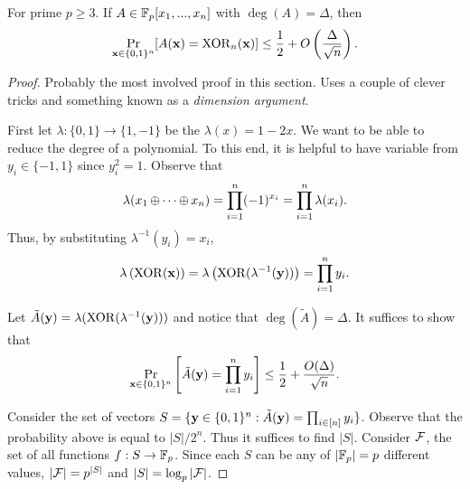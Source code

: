 \documentclass[11pt]{article}
\begin{document}
	\begin{theorem}
		\label{thm:UB-BoundPrRandPolyEqParity}
		For prime $p \geq 3$. If $A \in \mathbb{F}_p[x_1, ..., x_n]$ with $\deg(A) = \Delta$, then 
		\[\Pr_{\mathbf{x} \in \{0,1\}^n}[A(\mathbf{x}) = \mathrm{XOR}_n(\mathbf{x})] \leq \frac{1}{2} + O\left(\frac{\Delta}{\sqrt{n}}\right).\]
	\end{theorem}
	\begin{proof}
		Probably the most involved proof in this section. Uses a couple of clever tricks and something known as a \emph{dimension argument}.
		
		First let $\lambda: \{0,1\} \rightarrow \{1,-1\}$ be the $\lambda(x) = 1 - 2x$. We want to be able to reduce the degree of a polynomial. To this end, it is helpful to have variable from $y_i \in \{-1,1\}$ since $y_i^2 = 1$. Observe that 
		\[\lambda(x_1 \operatorname{\oplus} \cdots \operatorname{\oplus} x_n) = \prod_{i = 1}^{n} (-1)^{x_i} = \prod_{i = 1}^{n}\lambda(x_i).\]
		Thus, by substituting $\lambda^{-1}(y_i) = x_i$, 
		\[\lambda\left(\mathrm{XOR}(\mathbf{x})\right) = \lambda\left(\mathrm{XOR}(\lambda^{-1}(\mathbf{y}))\right)= \prod_{i = 1}^{n}y_i.\]
		
		Let $\tilde{A}(\mathbf{y}) = \lambda(\mathrm{XOR}(\lambda^{-1}(\mathbf{y})))$ and notice that $\deg(\tilde{A}) = \Delta$. It suffices to show that 
		\[\Pr_{\mathbf{x} \in \{0,1\}^n}\left[\tilde{A}(\mathbf{y}) = \prod_{i = 1}^{n}y_i\right] \leq \frac{1}{2} + \frac{O(\Delta)}{\sqrt{n}}.\]
		
		Consider the set of vectors $S = \{\mathbf{y} \in \{0,1\}^n: \tilde{A}(\mathbf{y}) = \prod_{i \in [n]} y_i\}$. Observe that the probability above is equal to $|S|/2^n$. Thus it suffices to find $|S|$. Consider $\mathcal{F}$, the set of all functions $f: S \rightarrow \mathbb{F}_p$. Since each $S$ can be any of $|\mathbb{F}_p| = p$ different values, $|\mathcal{F}| = p^{|S|}$ and $|S| = \log_p |\mathcal{F}|$.
		

\end{proof}
\end{document}
